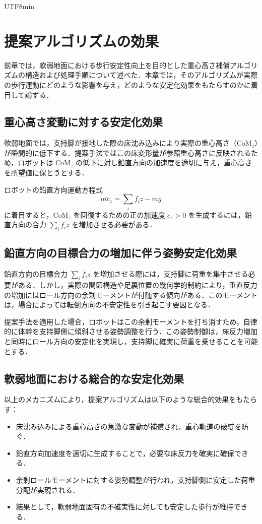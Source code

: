 \documentclass[a4paper,11pt]{report}
\begin{document}
\begin{CJK}{UTF8}{min}
\chapter{提案アルゴリズムの効果}

前章では，軟弱地面における歩行安定性向上を目的とした重心高さ補償アルゴリズムの構造および処理手順について述べた．本章では，そのアルゴリズムが実際の歩行運動にどのような影響を与え，どのような安定化効果をもたらすのかに着目して論ずる．

\section{重心高さ変動に対する安定化効果}
軟弱地面では，支持脚が接地した際の床沈み込みにより実際の重心高さ（CoM$_{z}$）が瞬間的に低下する．提案手法ではこの床変形量が参照重心高さに反映されるため，ロボットは CoM$_{z}$ の低下に対し鉛直方向の加速度を適切に与え，重心高さを所望値に保とうとする．

ロボットの鉛直方向運動方程式
\begin{equation}
    m\ddot{c}_z = \sum_{i}{f_iz} - mg
\end{equation}
に着目すると，CoM$_{z}$ を回復するための正の加速度 $\ddot{c}_z>0$ を生成するには，鉛直方向の合力 $ \sum_{i}{f_iz}$ を増加させる必要がある．

\section{鉛直方向の目標合力の増加に伴う姿勢安定化効果}
鉛直方向の目標合力 $ \sum_{i}{f_iz}$ を増加させる際には，支持脚に荷重を集中させる必要がある．しかし，実際の関節構造や足裏位置の幾何学的制約により，垂直反力の増加にはロール方向の余剰モーメントが付随する傾向がある．このモーメントは，場合によっては転倒方向の不安定性を引き起こす要因となる．

提案手法を適用した場合，ロボットはこの余剰モーメントを打ち消すため，自律的に体幹を支持脚側に傾斜させる姿勢調整を行う．この姿勢制御は，床反力増加と同時にロール方向の安定化を実現し，支持脚に確実に荷重を乗せることを可能とする．

\section{軟弱地面における総合的な安定化効果}
以上のメカニズムにより，提案アルゴリズムは以下のような総合的効果をもたらす：

\begin{itemize}
    \item 床沈み込みによる重心高さの急激な変動が補償され，重心軌道の破綻を防ぐ．
    \item 鉛直方向加速度を適切に生成することで，必要な床反力を確実に確保できる．
    \item 余剰ロールモーメントに対する姿勢調整が行われ，支持脚側に安定した荷重分配が実現される．
    \item 結果として，軟弱地面固有の不確実性に対しても安定した歩行が維持できる．
\end{itemize}


\end{CJK}
\end{document}
